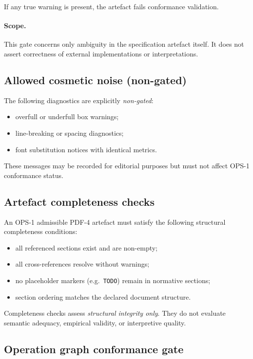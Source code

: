 If any true warning is present, the artefact fails conformance validation.

\paragraph{Scope.}
This gate concerns only ambiguity in the specification artefact itself. It does
not assert correctness of external implementations or interpretations.

\subsection{Allowed cosmetic noise (non-gated)}

The following diagnostics are explicitly \emph{non-gated}:
\begin{itemize}
  \item overfull or underfull box warnings;
  \item line-breaking or spacing diagnostics;
  \item font substitution notices with identical metrics.
\end{itemize}

These messages may be recorded for editorial purposes but must not affect OPS-1
conformance status.

\subsection{Artefact completeness checks}

An OPS-1 admissible PDF-4 artefact must satisfy the following structural
completeness conditions:
\begin{itemize}
  \item all referenced sections exist and are non-empty;
  \item all cross-references resolve without warnings;
  \item no placeholder markers (e.g.\ \texttt{TODO}) remain in normative sections;
  \item section ordering matches the declared document structure.
\end{itemize}

Completeness checks assess \emph{structural integrity only}. They do not evaluate
semantic adequacy, empirical validity, or interpretive quality.

\subsection{Operation graph conformance gate}

